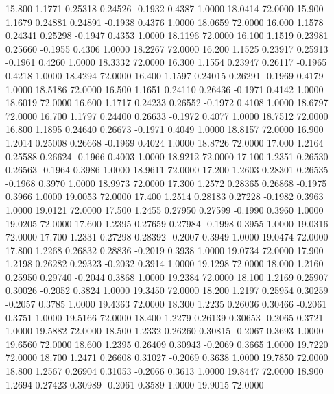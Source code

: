   15.800   1.1771   0.25318   0.24526  -0.1932   0.4387   1.0000  18.0414  72.0000
  15.900   1.1679   0.24881   0.24891  -0.1938   0.4376   1.0000  18.0659  72.0000
  16.000   1.1578   0.24341   0.25298  -0.1947   0.4353   1.0000  18.1196  72.0000
  16.100   1.1519   0.23981   0.25660  -0.1955   0.4306   1.0000  18.2267  72.0000
  16.200   1.1525   0.23917   0.25913  -0.1961   0.4260   1.0000  18.3332  72.0000
  16.300   1.1554   0.23947   0.26117  -0.1965   0.4218   1.0000  18.4294  72.0000
  16.400   1.1597   0.24015   0.26291  -0.1969   0.4179   1.0000  18.5186  72.0000
  16.500   1.1651   0.24110   0.26436  -0.1971   0.4142   1.0000  18.6019  72.0000
  16.600   1.1717   0.24233   0.26552  -0.1972   0.4108   1.0000  18.6797  72.0000
  16.700   1.1797   0.24400   0.26633  -0.1972   0.4077   1.0000  18.7512  72.0000
  16.800   1.1895   0.24640   0.26673  -0.1971   0.4049   1.0000  18.8157  72.0000
  16.900   1.2014   0.25008   0.26668  -0.1969   0.4024   1.0000  18.8726  72.0000
  17.000   1.2164   0.25588   0.26624  -0.1966   0.4003   1.0000  18.9212  72.0000
  17.100   1.2351   0.26530   0.26563  -0.1964   0.3986   1.0000  18.9611  72.0000
  17.200   1.2603   0.28301   0.26535  -0.1968   0.3970   1.0000  18.9973  72.0000
  17.300   1.2572   0.28365   0.26868  -0.1975   0.3966   1.0000  19.0053  72.0000
  17.400   1.2514   0.28183   0.27228  -0.1982   0.3963   1.0000  19.0121  72.0000
  17.500   1.2455   0.27950   0.27599  -0.1990   0.3960   1.0000  19.0205  72.0000
  17.600   1.2395   0.27659   0.27984  -0.1998   0.3955   1.0000  19.0316  72.0000
  17.700   1.2331   0.27298   0.28392  -0.2007   0.3949   1.0000  19.0474  72.0000
  17.800   1.2268   0.26832   0.28836  -0.2019   0.3938   1.0000  19.0734  72.0000
  17.900   1.2198   0.26282   0.29323  -0.2032   0.3914   1.0000  19.1298  72.0000
  18.000   1.2160   0.25950   0.29740  -0.2044   0.3868   1.0000  19.2384  72.0000
  18.100   1.2169   0.25907   0.30026  -0.2052   0.3824   1.0000  19.3450  72.0000
  18.200   1.2197   0.25954   0.30259  -0.2057   0.3785   1.0000  19.4363  72.0000
  18.300   1.2235   0.26036   0.30466  -0.2061   0.3751   1.0000  19.5166  72.0000
  18.400   1.2279   0.26139   0.30653  -0.2065   0.3721   1.0000  19.5882  72.0000
  18.500   1.2332   0.26260   0.30815  -0.2067   0.3693   1.0000  19.6560  72.0000
  18.600   1.2395   0.26409   0.30943  -0.2069   0.3665   1.0000  19.7220  72.0000
  18.700   1.2471   0.26608   0.31027  -0.2069   0.3638   1.0000  19.7850  72.0000
  18.800   1.2567   0.26904   0.31053  -0.2066   0.3613   1.0000  19.8447  72.0000
  18.900   1.2694   0.27423   0.30989  -0.2061   0.3589   1.0000  19.9015  72.0000
